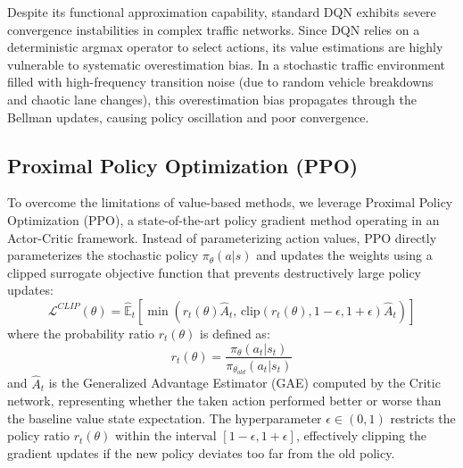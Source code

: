 \documentclass[conference]{IEEEtran}
\begin{document}
Despite its functional approximation capability, standard DQN exhibits severe convergence instabilities in complex traffic networks. Since DQN relies on a deterministic argmax operator to select actions, its value estimations are highly vulnerable to systematic overestimation bias. In a stochastic traffic environment filled with high-frequency transition noise (due to random vehicle breakdowns and chaotic lane changes), this overestimation bias propagates through the Bellman updates, causing policy oscillation and poor convergence.

\subsection{Proximal Policy Optimization (PPO)}
To overcome the limitations of value-based methods, we leverage Proximal Policy Optimization (PPO), a state-of-the-art policy gradient method operating in an Actor-Critic framework. Instead of parameterizing action values, PPO directly parameterizes the stochastic policy $\pi_\theta(a|s)$ and updates the weights using a clipped surrogate objective function that prevents destructively large policy updates:
\begin{equation}
\mathcal{L}^{CLIP}(\theta) = \hat{\mathbb{E}}_t \left[ \min\left( r_t(\theta) \hat{A}_t, \, \text{clip}(r_t(\theta), 1-\epsilon, 1+\epsilon) \hat{A}_t \right) \right]
\end{equation}
where the probability ratio $r_t(\theta)$ is defined as:
\begin{equation}
r_t(\theta) = \frac{\pi_\theta(a_t | s_t)}{\pi_{\theta_{old}}(a_t | s_t)}
\end{equation}
and $\hat{A}_t$ is the Generalized Advantage Estimator (GAE) computed by the Critic network, representing whether the taken action performed better or worse than the baseline value state expectation. The hyperparameter $\epsilon \in (0, 1)$ restricts the policy ratio $r_t(\theta)$ within the interval $[1-\epsilon, 1+\epsilon]$, effectively clipping the gradient updates if the new policy deviates too far from the old policy.
\end{document}
